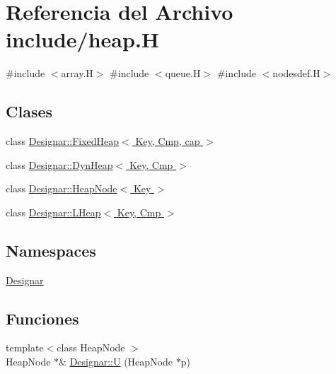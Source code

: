 \hypertarget{heap_8_h}{}\section{Referencia del Archivo include/heap.H}
\label{heap_8_h}
{\ttfamily \#include $<$array.\+H$>$}\newline
{\ttfamily \#include $<$queue.\+H$>$}\newline
{\ttfamily \#include $<$nodesdef.\+H$>$}\newline
\subsection*{Clases}
\begin{DoxyCompactItemize}
\item 
class \hyperlink{class_designar_1_1_fixed_heap}{Designar\+::\+Fixed\+Heap$<$ Key, Cmp, cap $>$}
\item 
class \hyperlink{class_designar_1_1_dyn_heap}{Designar\+::\+Dyn\+Heap$<$ Key, Cmp $>$}
\item 
class \hyperlink{class_designar_1_1_heap_node}{Designar\+::\+Heap\+Node$<$ Key $>$}
\item 
class \hyperlink{class_designar_1_1_l_heap}{Designar\+::\+L\+Heap$<$ Key, Cmp $>$}
\end{DoxyCompactItemize}
\subsection*{Namespaces}
\begin{DoxyCompactItemize}
\item 
 \hyperlink{namespace_designar}{Designar}
\end{DoxyCompactItemize}
\subsection*{Funciones}
\begin{DoxyCompactItemize}
\item 
{\footnotesize template$<$class Heap\+Node $>$ }\\Heap\+Node $\ast$\& \hyperlink{namespace_designar_a67f4b8d103125d6c93110f43f4446187}{Designar\+::U} (Heap\+Node $\ast$p)
\end{DoxyCompactItemize}
